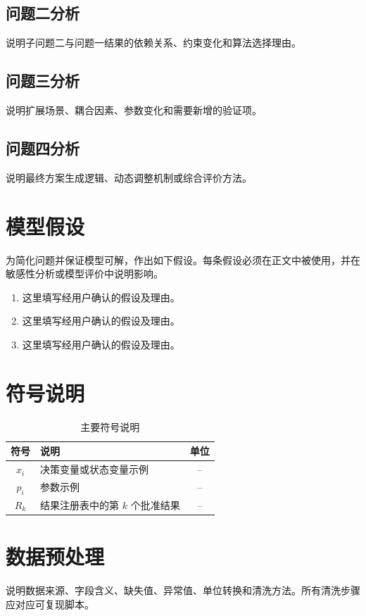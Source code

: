 \documentclass[UTF8,a4paper,12pt]{ctexart}
\begin{document}
\subsection{问题二分析}
说明子问题二与问题一结果的依赖关系、约束变化和算法选择理由。

\subsection{问题三分析}
说明扩展场景、耦合因素、参数变化和需要新增的验证项。

\subsection{问题四分析}
说明最终方案生成逻辑、动态调整机制或综合评价方法。

\section{模型假设}
为简化问题并保证模型可解，作出如下假设。每条假设必须在正文中被使用，并在敏感性分析或模型评价中说明影响。

\begin{enumerate}[label=假设\arabic*：,leftmargin=4em]
  \item 这里填写经用户确认的假设及理由。
  \item 这里填写经用户确认的假设及理由。
  \item 这里填写经用户确认的假设及理由。
\end{enumerate}

\section{符号说明}
\begin{table}[H]
\centering
\caption{主要符号说明}
\begin{tabularx}{\textwidth}{CLC}
\toprule
符号 & 说明 & 单位 \\
\midrule
$x_i$ & 决策变量或状态变量示例 & -- \\
$p_i$ & 参数示例 & -- \\
$R_k$ & 结果注册表中的第 $k$ 个批准结果 & -- \\
\bottomrule
\end{tabularx}
\label{tab:symbols}
\end{table}

\section{数据预处理}
说明数据来源、字段含义、缺失值、异常值、单位转换和清洗方法。所有清洗步骤应对应可复现脚本。
\end{document}
